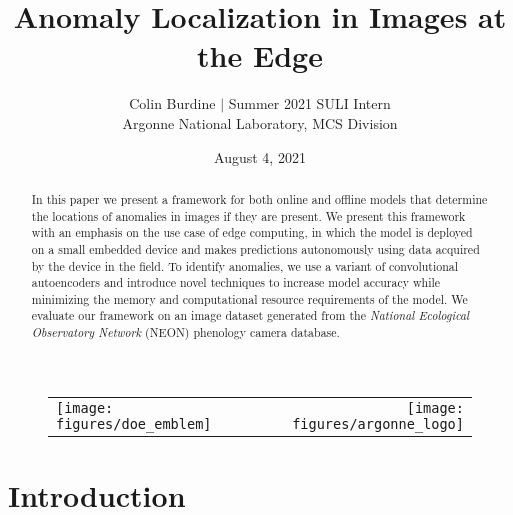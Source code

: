 \documentclass[12pt]{article}
\author{Colin Burdine $|$ Summer 2021 SULI Intern \\[6mm] Argonne National Laboratory, MCS Division}
\title{Anomaly Localization in Images at the Edge }
\date{August 4, 2021}
\begin{document}
\maketitle





\begin{abstract}
In this paper we present a framework for both online and offline models that determine the locations of anomalies in images if they are present.  We present this framework with an emphasis on the use case of edge computing, in which the model is deployed on a small embedded device and makes predictions autonomously using data acquired by the device in the field. To identify anomalies, we use a variant of convolutional autoencoders and introduce novel techniques to increase model accuracy while minimizing the memory and computational resource requirements of the model. We evaluate our framework on an image dataset generated from the \textit{National Ecological Observatory Network} (NEON) phenology camera database.
\end{abstract}

\begin{figure}
\begin{center}
\begin{tabular}{l r}
\texttt{[image: figures/doe\_emblem]} \qquad
& \qquad\texttt{[image: figures/argonne\_logo]} 
\end{tabular}
\end{center}
\end{figure}

\newpage

\tableofcontents
\newpage

\section{Introduction}
\end{document}
